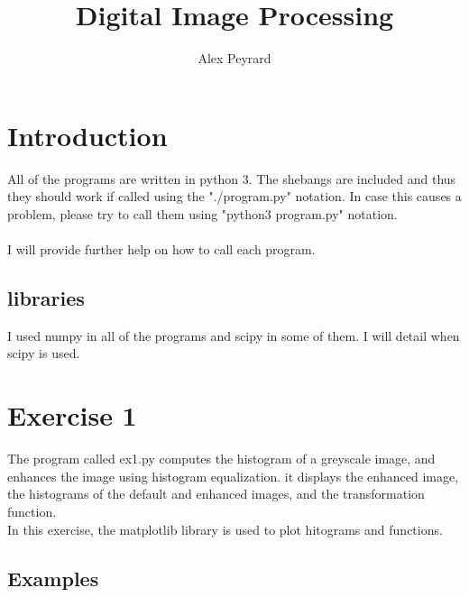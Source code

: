 \documentclass[10pt]{article}
\author{Alex Peyrard}
\title{Digital Image Processing}
\begin{document}
\maketitle
\section{Introduction}
All of the programs are written in python 3. The shebangs are included and thus they should work if called using the "./program.py" notation. In case this causes a problem, please try to call them using "python3 program.py" notation.\\\\
I will provide further help on how to call each program.
\subsection{libraries}
I used numpy in all of the programs and scipy in some of them. I will detail when scipy is used.
\section{Exercise 1}
The program called ex1.py computes the histogram of a greyscale image, and enhances the image using histogram equalization. it displays the enhanced image, the histograms of the default and enhanced images, and the transformation function.\\
In this exercise, the matplotlib library is used to plot hitograms and functions.
\subsection{Examples}
\end{document}
